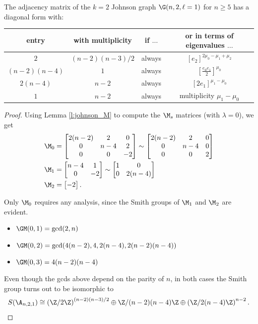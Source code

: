 \begin{theorem}
The adjacency matrix of the $k=2$ Johnson graph $\G(n, 2, \ell = 1)$ for $n \geq 5$ has a diagonal form with:
\begin{center}
\begin{tabular}{ |c|c|c||c| } 
 \hline
 entry & with multiplicity & if $\ldots$ & or in terms of eigenvalues $\ldots$ \\ 
 \hline
$2$ & $(n-2)(n-3)/2$ & always &  $[e_2]^{2\mu_{0} - \mu_{1} + \mu_{2}}$\\
$(n - 2)(n - 4)$ & $1$ & always & $[\frac{e_{0}e_{1}}{2}]^{\mu_{0}}$ \\
$2(n-4)$ & $n - 2$ & always & $[2e_{1}]^{\mu_{1}-\mu_{0}}$ \\
$1$ & $n-2$ & always & multiplicity $\mu_1 - \mu_0$ \\
 \hline
\end{tabular}
\end{center}
\end{theorem}
\begin{proof} 
 Using Lemma \ref{l:johnson_M} to compute the $\M_s$ matrices (with $\lambda = 0$), we get
\begin{align*}
\M_0 &= \begin{bmatrix} 2(n-2) & 2 & 0 \\ 0 & n-4 & 2 \\ 0 & 0 & -2 \end{bmatrix} \sim \begin{bmatrix} 2(n-2) & 2 & 0 \\ 0 & n-4 & 0 \\ 0 & 0 & 2 \end{bmatrix}\\
 \M_1 &= \begin{bmatrix} n-4 & 1 \\ 0 & -2 \end{bmatrix} \sim \begin{bmatrix} 1 & 0 \\ 0 & 2(n-4) \end{bmatrix}\\
 \M_2 &= \begin{bmatrix} -2 \end{bmatrix}.
 \end{align*}

Only $\M_{0}$ requires any analysis, since the Smith groups of $\M_1$ and $\M_2$ are evident.
\begin{itemize}
    \item $\GM(0, 1) = \gcd(2, n)$
    \item $\GM(0, 2) = \gcd(4(n-2), 4, 2(n-4), 2(n-2)(n-4))$
    \item $\GM(0, 3) =  4(n-2)(n-4)$
\end{itemize}
Even though the gcds above depend on the parity of $n$, in both cases the Smith group turns out to be isomorphic to
\[S(\A_{n,2,1}) \cong \left ( \Z/2\Z \right )^{(n-2)(n-3)/2} \oplus \Z/(n-2)(n-4)\Z \oplus \left ( \Z/2(n-4)\Z \right )^{n-2}.\]
\end{proof}


